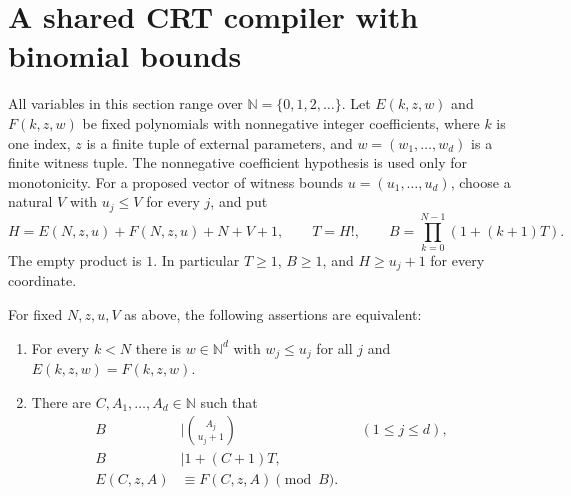 \section{A shared CRT compiler with binomial bounds}
\label{sec:shared-crt}

All variables in this section range over $\mathbb N=\{0,1,2,\ldots\}$.
Let $E(k,z,w)$ and $F(k,z,w)$ be fixed polynomials with nonnegative
integer coefficients, where $k$ is one index, $z$ is a finite tuple of
external parameters, and $w=(w_1,\ldots,w_d)$ is a finite witness tuple.
The nonnegative coefficient hypothesis is used only for monotonicity.
For a proposed vector of witness bounds $u=(u_1,\ldots,u_d)$, choose a
natural $V$ with $u_j\le V$ for every $j$, and put
\[
 H=E(N,z,u)+F(N,z,u)+N+V+1,\qquad T=H!,\qquad
 B=\prod_{k=0}^{N-1}(1+(k+1)T).
\]
The empty product is $1$.  In particular $T\ge1$, $B\ge1$, and
$H\ge u_j+1$ for every coordinate.

\begin{theorem}
\label{thm:shared-binomial}
For fixed $N,z,u,V$ as above, the following assertions are equivalent:
\begin{enumerate}
\item For every $k<N$ there is $w\in\mathbb N^d$ with
      $w_j\le u_j$ for all $j$ and $E(k,z,w)=F(k,z,w)$.
\item There are $C,A_1,\ldots,A_d\in\mathbb N$ such that
\begin{align}
 B&\mid\binom{A_j}{u_j+1} &&(1\le j\le d),\label{eq:choose-bounds}\\
 B&\mid1+(C+1)T,\label{eq:index-divisibility}\\
 E(C,z,A)&\equiv F(C,z,A)\pmod B.\label{eq:evaluation-congruence}
\end{align}
\end{enumerate}
\end{theorem}

